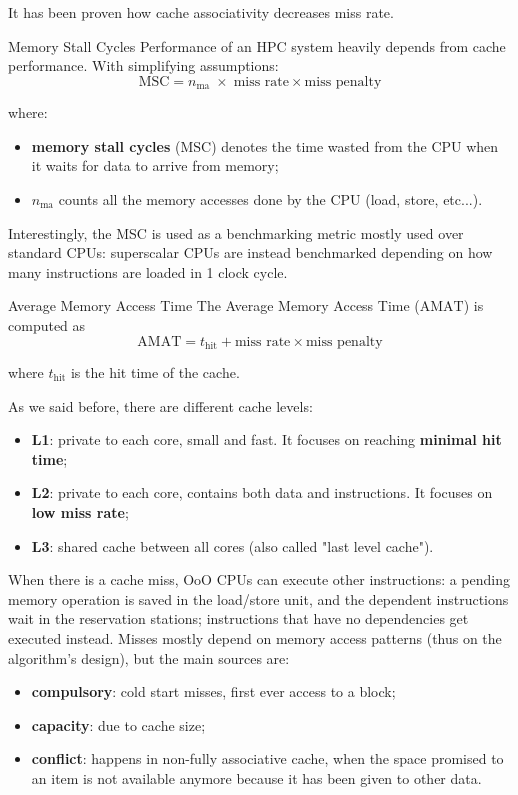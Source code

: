 It has been proven how cache associativity decreases miss rate.

\begin{definition}{Memory Stall Cycles}
    Performance of an HPC system heavily depends from cache performance. With simplifying assumptions:
    \[ \text{MSC} = n_{\text{ma}} \; \times \; \text{miss rate} \times \text{miss penalty} \]
    
    where:
    \begin{itemize}
        \item \textbf{memory stall cycles} ($\text{MSC}$) denotes the time wasted from the CPU when it waits for data to arrive from memory;
        \item $n_{\text{ma}}$ counts all the memory accesses done by the CPU (load, store, etc...).
    \end{itemize}
\end{definition}

Interestingly, the MSC is used as a benchmarking metric mostly used over standard CPUs: superscalar CPUs are instead benchmarked depending on how many instructions are loaded in 1 clock cycle.

\begin{definition}{Average Memory Access Time}
    The Average Memory Access Time ($\text{AMAT}$) is computed as
    \[ \text{AMAT} = t_{\text{hit}} + \text{miss rate} \times \text{miss penalty} \]

    where $t_{\text{hit}}$ is the hit time of the cache.
\end{definition}

As we said before, there are different cache levels:
\begin{itemize}
    \item \textbf{L1}: private to each core, small and fast. It focuses on reaching \textbf{minimal hit time};
    \item \textbf{L2}: private to each core, contains both data and instructions. It focuses on \textbf{low miss rate};
    \item \textbf{L3}: shared cache between all cores (also called "last level cache").
\end{itemize}

When there is a cache miss, OoO CPUs can execute other instructions: a pending memory operation is saved in the load/store unit, and the dependent instructions wait in the reservation stations; instructions that have no dependencies get executed instead.
\nwl
Misses mostly depend on memory access patterns (thus on the algorithm's design), but the main sources are:
\begin{itemize}
    \item \textbf{compulsory}: cold start misses, first ever access to a block;
    \item \textbf{capacity}: due to cache size;
    \item \textbf{conflict}: happens in non-fully associative cache, when the space promised to an item is not available anymore because it has been given to other data.
\end{itemize}

